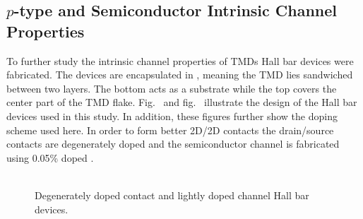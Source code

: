 \subsection{$p$-type  and  Semiconductor Intrinsic Channel Properties}\label{subsec:mos2_intrinsic_properties}
To further study the intrinsic channel properties of \acp{TMD} Hall bar devices were fabricated. The devices are encapsulated in \hbn, meaning the \acs{TMD} lies sandwiched between two \hbn layers. The bottom \hbn acts as a substrate while the top \hbn covers the center part of the \acs{TMD} flake. Fig.~ and fig.~ illustrate the design of the Hall bar devices used in this study. In addition, these figures further show the doping scheme used here. In order to form better 2D/2D contacts the drain/source contacts are degenerately doped  and the semiconductor channel is fabricated using 0.05\%  doped . \\ \\ 
\begin{figure}[ht]
	\centering
	\qquad
	\caption[Degenerately doped contacts and 0.05\%  channel doped  Hall bar devices]{Degenerately doped contact and lightly doped channel  Hall bar devices.}
	\label{fig:hall_bar_NbWSe2_devices}
\end{figure}
 
